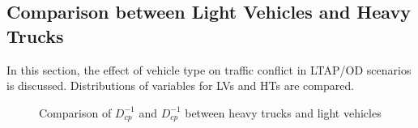 \documentclass[letterpaper, 10 pt, conference]{ieeeconf}
\begin{document}
\subsection{Comparison between Light Vehicles and Heavy Trucks}
In this section, the effect of vehicle type on traffic conflict in LTAP/OD scenarios is discussed. Distributions of variables for LVs and HTs are compared. 

  \begin{figure}[b]        
\caption{Comparison of $D_{cp}^{-1}$ and $D_{cp}^{-1}$ between heavy trucks and light vehicles}%
     \label{fig:Tcp and Dcp}
  \end{figure}


     
     
\end{document}
